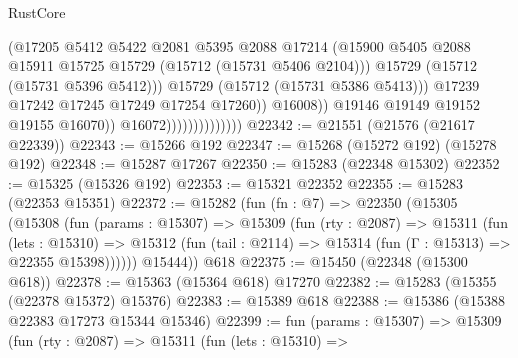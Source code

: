 \begin{lexlean}{RustCore}
\begin{coremodule}
                                              (@17205
                                                @5412
                                                @5422
                                                @2081
                                                @5395
                                                @2088
                                                @17214
                                                (@15900
                                                  @5405
                                                  @2088
                                                  @15911
                                                  @15725
                                                  @15729
                                                  (@15712 (@15731 @5406 @2104)))
                                                @15729
                                                (@15712 (@15731 @5396 @5412)))
                                              @15729
                                              (@15712 (@15731 @5386 @5413)))
                                            @17239
                                            @17242
                                            @17245
                                            @17249
                                            @17254
                                            @17260))
                                        @16008))
                                    @19146
                                    @19149
                                    @19152
                                    @19155
                                    @16070))
                                @16072))))))))))))))
@22342 := @21551 (@21576 (@21617 @22339))
@22343 := @15266 @192
@22347 := @15268 (@15272 @192) (@15278 @192)
@22348 := @15287 @17267
@22350 := @15283 (@22348 @15302)
@22352 := @15325 (@15326 @192)
@22353 := @15321 @22352
@22355 := @15283 (@22353 @15351)
@22372 := @15282
    (fun (fn : @7) =>
    @22350
      (@15305
        (@15308
          (fun (params : @15307) =>
          @15309
            (fun (rty : @2087) =>
            @15311
              (fun (lets : @15310) =>
              @15312 (fun (tail : @2114) => @15314 (fun (Γ : @15313) => @22355 @15398))))))
        @15444))
    @618
@22375 := @15450 (@22348 (@15300 @618))
@22378 := @15363 (@15364 @618) @17270
@22382 := @15283 (@15355 (@22378 @15372) @15376)
@22383 := @15389 @618
@22388 := @15386 (@15388 @22383 @17273 @15344 @15346)
@22399 := fun (params : @15307) =>
  @15309
    (fun (rty : @2087) =>
    @15311
      (fun (lets : @15310) =>

\end{coremodule}
\end{lexlean}
